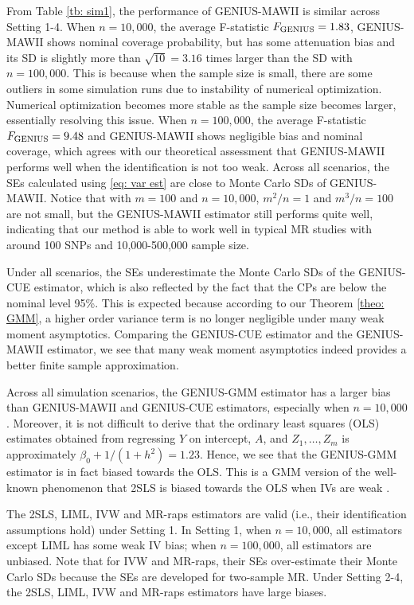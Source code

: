 \documentclass[12pt]{article}
\begin{document}
{From Table \ref{tb: sim1}, the performance of GENIUS-MAWII is similar across Setting 1-4.  When $n=10,000$, the average F-statistic 
$F_{\rm GENIUS} =1.83$,   {GENIUS-MAWII shows nominal coverage probability, but has some attenuation bias and its SD is slightly more than $\sqrt{10}=3.16$  times larger than the SD with $n=100,000$. 
	This is because when the sample size is small, there are some outliers in some simulation runs due to instability of numerical optimization. Numerical optimization becomes more stable as the sample size becomes larger, essentially resolving this issue.}  When $n=100,000$, the average F-statistic $F_{\rm GENIUS} =9.48$ and  GENIUS-MAWII  shows negligible bias and nominal coverage, which  agrees with our theoretical assessment that GENIUS-MAWII  performs well when the identification is not too weak. Across all scenarios, the SEs calculated using \eqref{eq: var est} are close to Monte Carlo  SDs of GENIUS-MAWII.  Notice that with $m=100$ and $ n=10,000$, $m^2/n=1$ and $m^3/n=100$ are not small, but the GENIUS-MAWII estimator still performs quite well, indicating that our method is able to work well in typical MR studies with around 100 SNPs and 10,000-500,000 sample size. 

 Under all scenarios, the SEs underestimate the  Monte Carlo  SDs of the GENIUS-CUE estimator, which is also reflected by the fact that the CPs are below the nominal level 95\%. This is expected because according to our Theorem \ref{theo: GMM}, a higher order variance term is no longer negligible under many weak moment asymptotics. Comparing the GENIUS-CUE estimator and the GENIUS-MAWII estimator, we see that many weak moment asymptotics indeed provides a better finite sample approximation. 

Across all simulation scenarios, the GENIUS-GMM estimator has a larger bias than GENIUS-MAWII and GENIUS-CUE estimators, especially when $n=10,000$. Moreover,  it is not difficult to derive that the ordinary least squares (OLS) estimates obtained from regressing $Y$ on  intercept, $A$, and $Z_1,\dots, Z_m$ is approximately $\beta_0 + 1/(1+h^2) = 1.23$. Hence, we see that the GENIUS-GMM estimator is in fact biased towards the OLS. This is a GMM version of the well-known phenomenon that 2SLS is biased towards the OLS when IVs are weak \citep{Stock:2002aa}. 


The 2SLS, LIML, IVW and MR-raps estimators are valid (i.e., their identification assumptions hold) under Setting 1. In Setting 1, when $n=10,000$, all estimators except LIML has some  weak IV bias; when $n=100,000$, all estimators are unbiased. Note that for IVW and MR-raps, their SEs over-estimate their Monte Carlo SDs because the SEs are developed for two-sample MR. Under Setting 2-4, the 2SLS, LIML, IVW and MR-raps estimators have large biases. 

}
\end{document}
